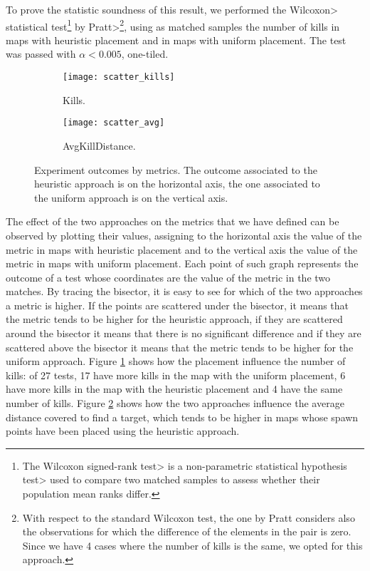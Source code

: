 \par

To prove the statistic soundness of this result, we performed the \<Wilcoxon> statistical test\footnote{The \<Wilcoxon signed-rank test> is a \<non-parametric statistical hypothesis test> used to compare two matched samples to assess whether their population mean ranks differ.} by \<Pratt>\footnote{With respect to the standard Wilcoxon test, the one by Pratt considers also the observations for which the difference of the elements in the pair is zero. Since we have 4 cases where the number of kills is the same, we opted for this approach.}, using as matched samples the number of kills in maps with heuristic placement and in maps with uniform placement. The test was passed with $\alpha < 0.005$, one-tiled.

\begin{figure}[h]
\centering
\begin{subfigure}[t]{0.48\linewidth}
\texttt{[image: scatter\_kills]}
\caption{Kills.}
\label{img:scatter_kills}
\end{subfigure}
\hfill
\begin{subfigure}[t]{0.48\linewidth}
\texttt{[image: scatter\_avg]}
\caption{AvgKillDistance.}
\label{img:scatter_avg}
\end{subfigure}
\caption[Experiment outcomes by metrics.]{Experiment outcomes by metrics. The outcome associated to the heuristic approach is on the horizontal axis, the one associated to the uniform approach is on the vertical axis.}
\label{img:metrics} 
\end{figure}

The effect of the two approaches on the metrics that we have defined can be observed by plotting their values, assigning to the horizontal axis the value of the metric in maps with heuristic placement and to the vertical axis the value of the metric in maps with uniform placement. Each point of such graph represents the outcome of a test whose coordinates are the value of the metric in the two matches. By tracing the bisector, it is easy to see for which of the two approaches a metric is higher. If the points are scattered under the bisector, it means that the metric tends to be higher for the heuristic approach, if they are scattered around the bisector it means that there is no significant difference and if they are scattered above the bisector it means that the metric tends to be higher for the uniform approach. Figure \ref{img:scatter_kills} shows how the placement influence the number of kills: of 27 tests, 17 have more kills in the map with the uniform placement, 6 have more kills in the map with the heuristic placement and 4 have the same number of kills. Figure \ref{img:scatter_avg} shows how the two approaches influence the average distance covered to find a target, which tends to be higher in maps whose spawn points have been placed using the heuristic approach.

